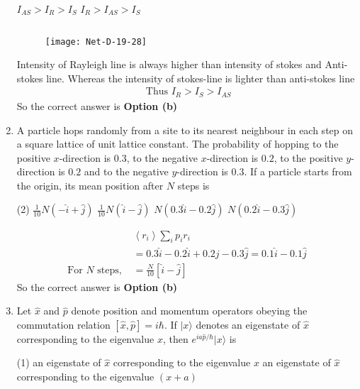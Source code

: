 \begin{enumerate}
\begin{tasks}
	\task[\textbf{c.}]$I_{A S}>I_{R}>I_{S}$
	\task[\textbf{d.}]$I_{R}>I_{A S}>I_{S}$ 
\end{tasks}
\begin{answer}$\left. \right. $
	\begin{figure}[H]
		\centering
		\texttt{[image: Net-D-19-28]}
	\end{figure}
	 Intensity of Rayleigh line is always higher than intensity of stokes and Anti-stokes line.
	Whereas the intensity of stokes-line is lighter than anti-stokes line
	\begin{align*}
	\text { Thus } I_{R}>I_{S}>I_{A S}
	\end{align*}
	So the correct answer is \textbf{Option (b)}
\end{answer}
\item A particle hops randomly from a site to its nearest neighbour in each step on a square lattice of unit lattice constant. The probability of hopping to the positive $x$-direction is $0.3$, to the negative $x$-direction is $0.2$, to the positive $y$-direction is $0.2$ and to the negative $y$-direction is $0.3$. If a particle starts from the origin, its mean position after $N$ steps is
 \begin{tasks}(2)
	\task[\textbf{a.}] $\frac{1}{10} N(-\hat{i}+\hat{j})$
	\task[\textbf{b.}]$\frac{1}{10} N(\hat{i}-\hat{j})$
	\task[\textbf{c.}]$N(0.3 \hat{i}-0.2 \hat{j})$
	\task[\textbf{d.}]  $N(0.2 \hat{i}-0.3 \hat{j})$
\end{tasks}
\begin{answer}
	\begin{align*}
	&\left\langle r_{i}\right\rangle \sum_{i} p_{i} r_{i}\\
	&=0.3 \hat{i}-0.2 \hat{i}+0.2 j-0.3 \hat{j}=0.1 \hat{i}-0.1 \hat{j}\\
	\text{For $N$ steps, }&=\frac{N}{10}[\hat{i}-\hat{j}]
	\end{align*}
		So the correct answer is \textbf{Option (b)}
\end{answer}
\item Let $\hat{x}$ and $\hat{p}$ denote position and momentum operators obeying the commutation relation $[\hat{x}, \hat{p}]=i \hbar$. If $|x\rangle$ denotes an eigenstate of $\hat{x}$ corresponding to the eigenvalue $x$, then $e^{i a \hat{p} / \hbar}|x\rangle$ is	
 \begin{tasks}(1)
	\task[\textbf{a.}] an eigenstate of $\hat{x}$ corresponding to the eigenvalue $x$
	\task[\textbf{b.}] an eigenstate of $\hat{x}$ corresponding to the eigenvalue $(x+a)$

\end{tasks}
\end{enumerate}
